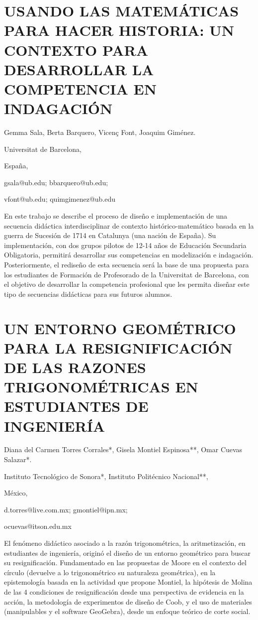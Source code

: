 \section{USANDO LAS MATEMÁTICAS PARA HACER HISTORIA: UN CONTEXTO PARA DESARROLLAR
LA COMPETENCIA EN INDAGACIÓN}

\begin{datos}

Gemma Sala, Berta Barquero, Vicenç Font, Joaquim Giménez.

Universitat de Barcelona,

España,

gsala@ub.edu; bbarquero@ub.edu;

vfont@ub.edu; quimgimenez@ub.edu 

\end{datos}

En este trabajo se describe el proceso de diseño e implementación
de una secuencia didáctica interdisciplinar de contexto histórico-matemático
basada en la guerra de Sucesión de 1714 en Catalunya (una nación de
España). Su implementación, con dos grupos pilotos de 12-14 años de
Educación Secundaria Obligatoria, permitirá desarrollar sus competencias
en modelización e indagación. Posteriormente, el rediseño de esta
secuencia será la base de una propuesta para los estudiantes de Formación
de Profesorado de la Universitat de Barcelona, con el objetivo de
desarrollar la competencia profesional que les permita diseñar este
tipo de secuencias didácticas para sus futuros alumnos.


\section{UN ENTORNO GEOMÉTRICO PARA LA RESIGNIFICACIÓN DE LAS RAZONES TRIGONOMÉTRICAS
EN ESTUDIANTES DE INGENIERÍA }

\begin{datos}

Diana del Carmen Torres Corrales{*}, Gisela Montiel Espinosa{*}{*},
Omar Cuevas Salazar{*}.

Instituto Tecnológico de Sonora{*}, Instituto Politécnico Nacional{*}{*},

México,

d.torres@live.com.mx; gmontiel@ipn.mx; 

ocuevas@itson.edu.mx 

\end{datos}

El fenómeno didáctico asociado a la razón trigonométrica, la aritmetización,
en estudiantes de ingeniería, originó el diseño de un entorno geométrico
para buscar su resignificación. Fundamentado en las propuestas de
Moore en el contexto del círculo (devuelve a lo trigonométrico su
naturaleza geométrica), en la epistemología basada en la actividad
que propone Montiel, la hipótesis de Molina de las 4 condiciones de
resignificación desde una perspectiva de evidencia en la acción, la
metodología de experimentos de diseño de Coob, y el uso de materiales
(manipulables y el software GeoGebra), desde un enfoque teórico de
corte social.


